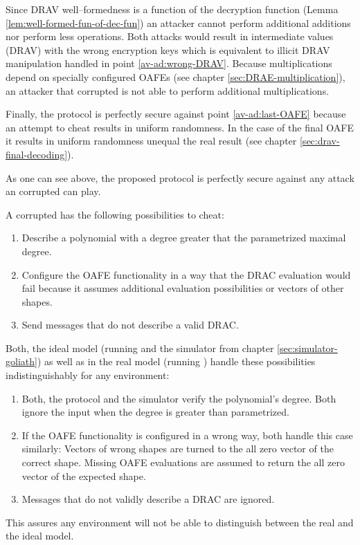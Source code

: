 Since DRAV well--formedness is a function of the decryption function (Lemma
\ref{lem:well-formed-fun-of-dec-fun}) an attacker cannot perform additional
additions nor perform less operations. Both attacks would result in intermediate
values (DRAV) with the wrong encryption keys which is equivalent to illicit DRAV
manipulation handled in point \ref{av-ad:wrong-DRAV}. Because multiplications
depend on specially configured OAFEs (see chapter
\ref{sec:DRAE-multiplication}), an attacker that corrupted \JWpTwo{} is not able
to perform additional multiplications.

Finally, the protocol is perfectly secure against point \ref{av-ad:last-OAFE}
because an attempt to cheat results in uniform randomness. In the case of
the final OAFE it results in uniform randomness unequal the real result (see
chapter \ref{sec:drav-final-decoding}).

As one can see above, the proposed protocol is perfectly secure against any
attack an corrupted \JWpTwo{} can play.



A corrupted \JWpOne{} has the following possibilities to cheat:

\begin{enumerate}

  \item Describe a polynomial with a degree greater that the parametrized
    maximal degree.

  \item Configure the OAFE functionality in a way that the DRAC evaluation would
    fail because it assumes additional evaluation possibilities or vectors of
    other shapes.

  \item Send messages that do not describe a valid DRAC.

\end{enumerate}

Both, the ideal model (running \JWfuncSymOPEnp{} and the simulator from chapter
\ref{sec:simulator-goliath}) as well as in the real model (running
\JWprotoSymOPE{}) handle these possibilities indistinguishably for any
environment:

\begin{enumerate}

  \item Both, the protocol and the simulator verify the polynomial's degree.
    Both ignore the input when the degree is greater than parametrized.

  \item If the OAFE functionality is configured in a wrong way, both handle this
    case similarly: Vectors of wrong shapes are turned to the all zero vector of
    the correct shape. Missing OAFE evaluations are assumed to return the all
    zero vector of the expected shape.

  \item Messages that do not validly describe a DRAC are ignored.

\end{enumerate}

This assures any environment will not be able to distinguish between the real
and the ideal model.

